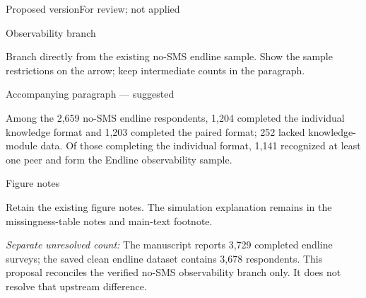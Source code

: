 \documentclass[11pt]{article}
\begin{document}
\newpage
{\LARGE Proposed version}\hfill{\small For review; not applied}

{\large Observability branch}

{\small Branch directly from the existing no-SMS endline sample. Show the sample restrictions on the arrow; keep intermediate counts in the paragraph.}

\begin{center}
\end{center}

{\large Accompanying paragraph — suggested}

Among the 2,659 no-SMS endline respondents, 1,204 completed the individual knowledge format and 1,203 completed the paired format; 252 lacked knowledge-module data. Of those completing the individual format, 1,141 recognized at least one peer and form the Endline observability sample.

{\large Figure notes}

Retain the existing figure notes. The simulation explanation remains in the missingness-table notes and main-text footnote.

\vfill
{\small\textit{Separate unresolved count:} The manuscript reports 3,729 completed endline surveys; the saved clean endline dataset contains 3,678 respondents. This proposal reconciles the verified no-SMS observability branch only. It does not resolve that upstream difference.}
\end{document}
